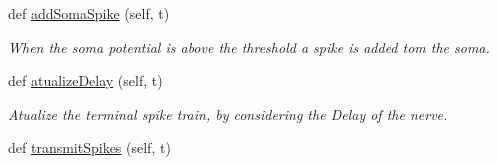 \begin{DoxyCompactItemize}
def \hyperlink{class_motor_unit_1_1_motor_unit_a6d597c703b3b469fbec7843a0f97c534}{add\+Soma\+Spike} (self, t)
\begin{DoxyCompactList}\small\item\em When the soma potential is above the threshold a spike is added tom the soma. \end{DoxyCompactList}\item 
def \hyperlink{class_motor_unit_1_1_motor_unit_a0aa5e024003845e3f48bc0e618068edc}{atualize\+Delay} (self, t)
\begin{DoxyCompactList}\small\item\em Atualize the terminal spike train, by considering the Delay of the nerve. \end{DoxyCompactList}\item 
def \hyperlink{class_motor_unit_1_1_motor_unit_ac3d3e69bf0b75eef81a015005052f5d3}{transmit\+Spikes} (self, t)
\end{DoxyCompactItemize}
